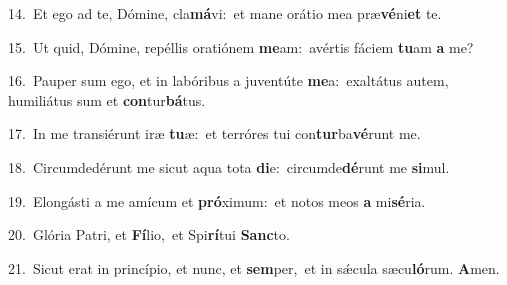 {\numbfont\textcolor{\numbcolor}{14.}}~Et ego ad te, Dómine, cla\-\textbf{má}\-vi:~\star et mane orátio mea præ\-\textbf{vé}\-ni\textbf{et} te.\par
{\numbfont\textcolor{\numbcolor}{15.}}~Ut quid, Dómine, repéllis oratiónem \textbf{me}\-am:~\star avértis fáciem \textbf{tu}\-am \textbf{a} me?\par
{\numbfont\textcolor{\numbcolor}{16.}}~Pauper sum ego, et in labóribus a juventúte \textbf{me}\-a:~\star exaltátus autem, humiliátus sum et \textbf{con}\-tur\-\textbf{bá}\-tus.\par
{\numbfont\textcolor{\numbcolor}{17.}}~In me transiérunt iræ \textbf{tu}\-æ:~\star et terróres tui con\-\textbf{tur}\-ba\-\textbf{vé}\-runt me.\par
{\numbfont\textcolor{\numbcolor}{18.}}~Circumdedérunt me sicut aqua tota \textbf{di}\-e:~\star circumde\-\textbf{dé}\-runt me \textbf{si}\-mul.\par
{\numbfont\textcolor{\numbcolor}{19.}}~Elongásti a me amícum et \textbf{pró}\-ximum:~\star et notos meos \textbf{a} mi\-\textbf{sé}\-ria.\par
{\numbfont\textcolor{\numbcolor}{20.}}~Glória Patri, et \textbf{Fí}\-lio,~\star et Spi\-\textbf{rí}\-tui \textbf{Sanc}\-to.\par
{\numbfont\textcolor{\numbcolor}{21.}}~Sicut erat in princípio, et nunc, et \textbf{sem}\-per,~\star et in sǽcula sæcu\-\textbf{ló}\-rum. \textbf{A}\-men.\par
